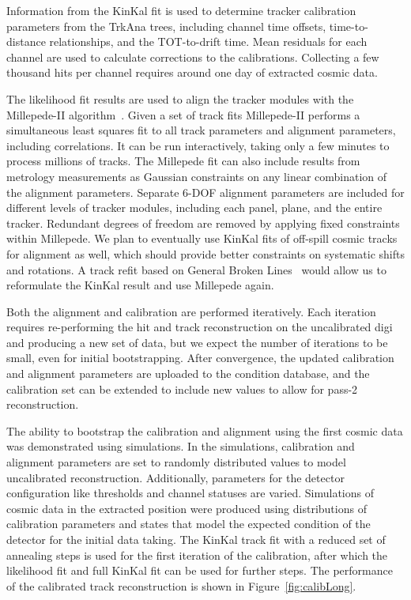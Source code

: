 Information from the KinKal fit is used to determine tracker calibration parameters from the TrkAna trees, including channel time offsets, time-to-distance relationships, and the TOT-to-drift time. Mean residuals for each channel are used to calculate corrections to the calibrations. Collecting a few thousand hits per channel requires around one day of extracted cosmic data.

The likelihood fit results are used to align the tracker modules with the Millepede-II algorithm~\cite{millepede1,millepede2}. Given a set of track fits Millepede-II performs a simultaneous least squares fit to all track parameters and alignment parameters, including correlations. It can be run interactively, taking only a few minutes to process millions of tracks. The Millepede fit can also include results from metrology measurements as Gaussian constraints on any linear combination of the alignment parameters. Separate 6-DOF alignment parameters are included for different levels of tracker modules, including each panel, plane, and the entire tracker. Redundant degrees of freedom are removed by applying fixed constraints within Millepede. We plan to eventually use KinKal fits of off-spill cosmic tracks for alignment as well, which should provide better constraints on systematic shifts and rotations. A track refit based on General Broken Lines~\cite{gbl} would allow us to reformulate the KinKal result and use Millepede again. 

Both the alignment and calibration are performed iteratively. Each iteration requires re-performing the hit and track reconstruction on the uncalibrated digi and producing a new set of data, but we expect the number of iterations to be small, even for initial bootstrapping. After convergence, the updated calibration and alignment parameters are uploaded to the condition database, and the calibration set can be extended to include new values to allow for pass-2 reconstruction. 

The ability to bootstrap the calibration and alignment using the first cosmic data was demonstrated using simulations. In the simulations, calibration and alignment parameters are set to randomly distributed values to model uncalibrated reconstruction. Additionally, parameters for the detector configuration like thresholds and channel statuses are varied. Simulations of cosmic data in the extracted position were produced using distributions of calibration parameters and states that model the expected condition of the detector for the initial data taking. The KinKal track fit with a reduced set of annealing steps is used for the first iteration of the calibration, after which the likelihood fit and full KinKal fit can be used for further steps. The performance of the calibrated track reconstruction is shown in Figure~\ref{fig:calibLong}. 


